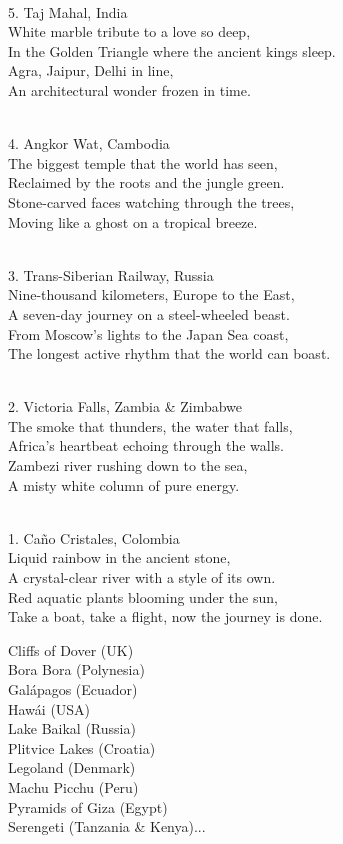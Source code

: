 \begin{lyrics}
\\
5. %
Taj Mahal, India
\\
White marble tribute to a love so deep,\\
In the Golden Triangle where the ancient kings sleep.\\
Agra, Jaipur, Delhi in line,\\
An architectural wonder frozen in time.

\\
4. %
Angkor Wat, Cambodia
\\
The biggest temple that the world has seen,\\
Reclaimed by the roots and the jungle green.\\
Stone-carved faces watching through the trees,\\
Moving like a ghost on a tropical breeze.

\\
3. %
Trans-Siberian Railway, Russia
\\
Nine-thousand kilometers, Europe to the East,\\
A seven-day journey on a steel-wheeled beast.\\
From Moscow’s lights to the Japan Sea coast,\\
The longest active rhythm that the world can boast.

\\
2. %
Victoria Falls, Zambia \& Zimbabwe
\\
The smoke that thunders, the water that falls,\\
Africa’s heartbeat echoing through the walls.\\
Zambezi river rushing down to the sea,\\
A misty white column of pure energy.

\\
1. %
Caño Cristales, Colombia
\\
Liquid rainbow in the ancient stone,\\
A crystal-clear river with a style of its own.\\
Red aquatic plants blooming under the sun,\\
Take a boat, take a flight, now the journey is done.


Cliffs of Dover (UK)\\
Bora Bora (Polynesia)\\
Galápagos (Ecuador)\\
Hawái (USA)\\
Lake Baikal (Russia)\\
Plitvice Lakes (Croatia)\\
Legoland (Denmark)\\
Machu Picchu (Peru)\\
Pyramids of Giza (Egypt)\\
Serengeti (Tanzania \& Kenya)...

\end{lyrics}

